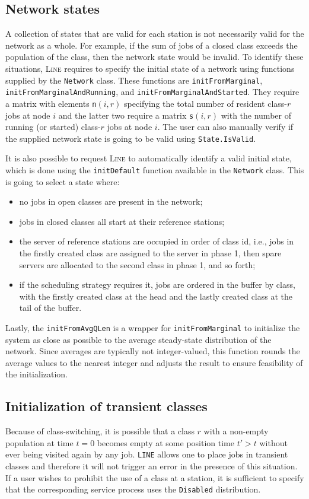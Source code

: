 \subsection{Network states}
A collection of states that are valid for each station is not necessarily valid for the network as a whole. For example, if the sum of jobs of a closed class exceeds the population of the class, then the network state would be invalid. To identify these situations, \textsc{Line} requires to specify the initial state of a network using functions supplied by the \texttt{Network} class. These functions are \texttt{initFromMarginal}, \texttt{initFromMarginalAndRunning}, and \texttt{initFromMarginalAndStarted}. They require a matrix with elements \texttt{n}$(i,r)$ specifying the total number of resident class-$r$ jobs at node $i$ and the latter two require a matrix \texttt{s}$(i,r)$ with the number of running (or started) class-$r$ jobs at node $i$. The user can also manually verify if the supplied network state is going to be valid using \texttt{State.IsValid}.

It is also possible to request \textsc{Line} to automatically identify a valid initial state, which is done using the \texttt{initDefault} function available in the \texttt{Network} class. This is going to select a state where:
\begin{itemize}
\item no jobs in open classes are present in the network;
\item jobs in closed classes all start at their reference stations;
\item the server of reference stations are occupied in order of class id, i.e., jobs in the firstly created class are assigned to the server in phase 1, then spare servers are allocated to the second class in phase 1, and so forth;
\item if the scheduling strategy requires it, jobs are ordered in the buffer by class, with the firstly created class at the head and the lastly created class at the tail of the buffer.
\end{itemize}

Lastly, the \texttt{initFromAvgQLen} is a wrapper for \texttt{initFromMarginal} to initialize the system as close as possible to the average steady-state distribution of the network. Since averages are typically not integer-valued, this function rounds the average values to the nearest integer and adjusts the result to ensure feasibility of the initialization.

\subsection{Initialization of transient classes}
Because of class-switching, it is possible that a class $r$ with a non-empty population at time $t=0$ becomes empty at some position time $t'>t$ without ever being visited again by any job. \texttt{LINE} allows one to place jobs in transient classes and therefore it will not trigger an error in the presence of this situation. If a user wishes to prohibit the use of a class at a station, it is sufficient to specify that the corresponding service process uses the \texttt{Disabled} distribution.

